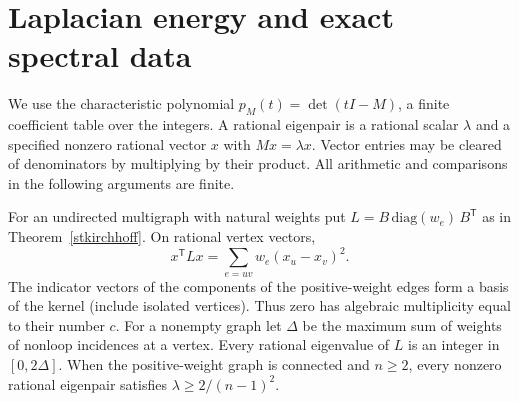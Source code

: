 \section{Laplacian energy and exact spectral data}\label{sec:spectral}
We use the characteristic polynomial $p_M(t)=\det(tI-M)$, a finite coefficient table over the integers. A rational eigenpair is a rational scalar $\lambda$ and a specified nonzero rational vector $x$ with $Mx=\lambda x$. Vector entries may be cleared of denominators by multiplying by their product. All arithmetic and comparisons in the following arguments are finite.

\begin{theorem}\leavevmode\label{spec:energy}
For an undirected multigraph with natural weights put $L=B\,\mathrm{diag}(w_e)\,B^{\mathsf T}$ as in Theorem~\ref{stkirchhoff}. On rational vertex vectors,
\[
 x^{\mathsf T}Lx=\sum_{e=uv} w_e(x_u-x_v)^2.
\]
The indicator vectors of the components of the positive-weight edges form a basis of the kernel (include isolated vertices). Thus zero has algebraic multiplicity equal to their number $c$. For a nonempty graph let $\Delta$ be the maximum sum of weights of nonloop incidences at a vertex. Every rational eigenvalue of $L$ is an integer in $[0,2\Delta]$. When the positive-weight graph is connected and $n\ge2$, every nonzero rational eigenpair satisfies $\lambda\ge 2/(n-1)^2$.
\end{theorem}
